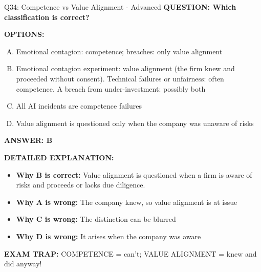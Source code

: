 \documentclass[8pt]{beamer}
\begin{document}
\begin{frame}[shrink=6]{Q34: Competence vs Value Alignment - Advanced}
\fontsize{6.5}{7.5}\selectfont
\textbf{QUESTION: Which classification is correct?}

\vspace{0.1cm}
\textbf{OPTIONS:}
\begin{enumerate}[A.]
\item Emotional contagion: competence; breaches: only value alignment
\item Emotional contagion experiment: value alignment (the firm knew and proceeded without consent). Technical failures or unfairness: often competence. A breach from under-investment: possibly both
\item All AI incidents are competence failures
\item Value alignment is questioned only when the company was unaware of risks
\end{enumerate}

\vspace{0.1cm}
\textcolor{myblue}{\textbf{ANSWER: B}}

\vspace{0.1cm}
\textbf{DETAILED EXPLANATION:}
\begin{itemize}
\item \textbf{Why B is correct:} Value alignment is questioned when a firm is aware of risks and proceeds or lacks due diligence.
\item \textbf{Why A is wrong:} The company knew, so value alignment is at issue
\item \textbf{Why C is wrong:} The distinction can be blurred
\item \textbf{Why D is wrong:} It arises when the company was aware
\end{itemize}

\textcolor{myred}{\textbf{EXAM TRAP:}} COMPETENCE = can't; VALUE ALIGNMENT = knew and did anyway!
\end{frame}
\end{document}
